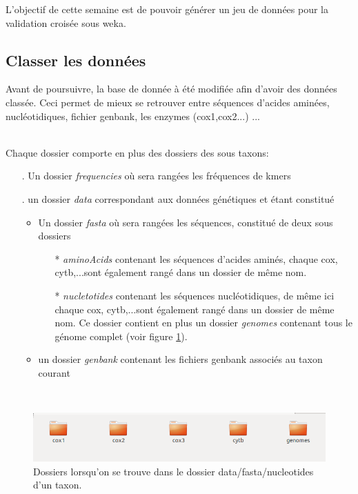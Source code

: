 L'objectif de cette semaine est de pouvoir générer un jeu de données pour la validation croisée sous weka.

\subsection{Classer les données}

Avant de poursuivre, la base de donnée à été modifiée afin d'avoir des données classée. Ceci permet de mieux se retrouver entre séquences d'acides aminées, nucléotidiques, fichier genbank, les enzymes (cox1,cox2...) ...

~\\
Chaque dossier comporte en plus des dossiers des sous taxons:

\begin{itemize}
 \item[.]Un dossier \textit{frequencies} où sera rangées les fréquences de kmers
  \item[.]un dossier \textit{data} correspondant aux données génétiques et étant constitué
  \begin{itemize}
 \item Un dossier \textit{fasta} où sera rangées les séquences, constitué de deux sous dossiers 
  \begin{itemize}
 \item[*]\textit{aminoAcids} contenant les séquences d'acides aminés, chaque cox, cytb,...sont également rangé dans un dossier de même nom. 
 
  \item[*]\textit{nucletotides} contenant les séquences nucléotidiques, de même ici chaque cox, cytb,...sont également rangé dans un dossier de même nom. Ce dossier contient en plus un dossier \textit{genomes} contenant tous le génome complet (voir figure \ref{dossierCox}).
  
\end{itemize}
  \item un dossier \textit{genbank} contenant les fichiers genbank associés au taxon courant
  
\end{itemize}
\end{itemize}
~\\

\begin{figure}[H]
\begin{center}
\includegraphics[scale=0.5]{./../img/dossier.png}
\caption{\label{dossierCox} Dossiers lorsqu'on se trouve dans le dossier data/fasta/nucleotides d'un taxon.}
\end{center}
\end{figure}
~\\

